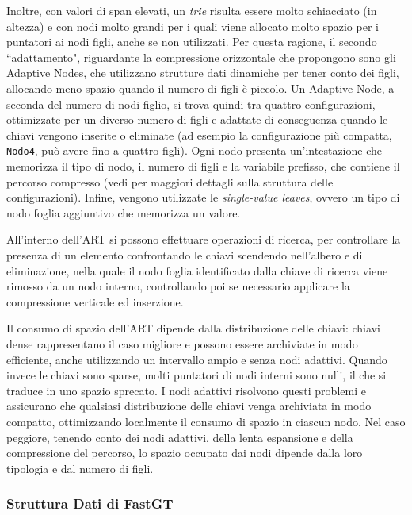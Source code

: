 \documentclass[../main.tex]{subfiles}
\begin{document}
Inoltre, con valori di span elevati, un \textit{trie} risulta essere molto schiacciato (in altezza) e con nodi molto grandi per i quali viene allocato molto spazio per i puntatori ai nodi figli, anche se non utilizzati. Per questa ragione, il secondo ``adattamento", riguardante la compressione orizzontale che \cite{leis2013art} propongono sono gli Adaptive Nodes, che utilizzano strutture dati dinamiche per tener conto dei figli, allocando meno spazio quando il numero di figli è piccolo. Un Adaptive Node, a seconda del numero di nodi figlio, si trova quindi tra quattro configurazioni, ottimizzate per un diverso numero di figli e adattate di conseguenza quando le chiavi vengono inserite o eliminate (ad esempio la configurazione più compatta, \texttt{Nodo4}, può avere fino a quattro figli). Ogni nodo presenta un'intestazione che memorizza il tipo di nodo, il numero di figli e la variabile prefisso, che contiene il percorso compresso (vedi \cite{leis2013art} per maggiori dettagli sulla struttura delle configurazioni). Infine, vengono utilizzate le  \textit{single-value leaves}, ovvero un tipo di nodo foglia aggiuntivo che memorizza un valore.

All'interno dell'ART si possono effettuare operazioni di ricerca, per controllare la presenza di un elemento confrontando le chiavi scendendo nell'albero e di eliminazione, nella quale il nodo foglia identificato dalla chiave di ricerca viene rimosso da un nodo interno, controllando poi se necessario applicare la compressione verticale ed inserzione.

Il consumo di spazio dell'ART dipende dalla distribuzione delle chiavi: chiavi dense rappresentano il caso migliore e possono essere archiviate in modo efficiente, anche utilizzando un intervallo ampio e senza nodi adattivi. Quando invece le chiavi sono sparse, molti puntatori di nodi interni sono nulli, il che si traduce in uno spazio sprecato. I nodi adattivi risolvono questi problemi e assicurano che qualsiasi distribuzione delle chiavi venga archiviata in modo compatto, ottimizzando localmente il consumo di spazio in ciascun nodo. Nel caso peggiore, tenendo conto dei nodi adattivi, della lenta espansione e della compressione del percorso, lo spazio occupato dai nodi dipende dalla loro tipologia e dal numero di figli.

\subsubsection{Struttura Dati di FastGT}
\label{strutturaDatiFastGT}
\end{document}
